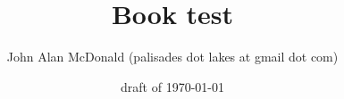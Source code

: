 \documentclass{PalisadesLakesBook}
\title{Book test}
\author{John Alan McDonald 
(palisades dot lakes at gmail dot com)}
\date{draft of \today}
\begin{document}
\maketitle
\PalisadesLakesTableOfContents

\end{document}

